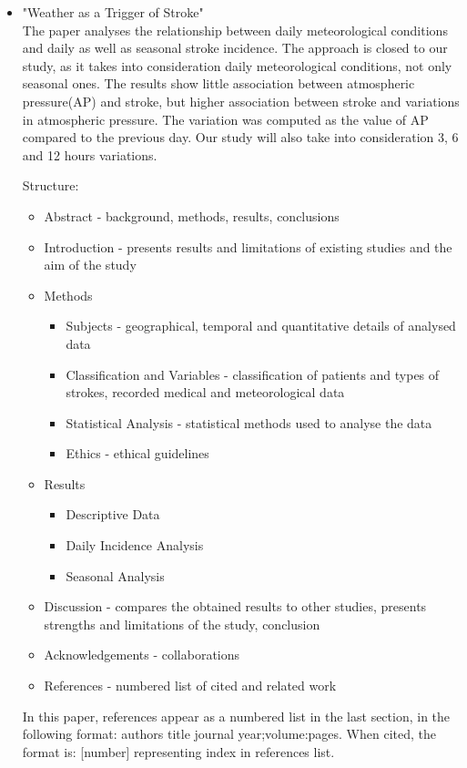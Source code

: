 \documentclass{article}
\begin{document}
\begin{itemize}
\item\large "Weather as a Trigger of Stroke"\\

\normalsize The paper \cite{Jimenez-Condea:2008dg} analyses the relationship between daily meteorological conditions and daily as well as seasonal stroke incidence. The approach is closed to our study, as it takes into consideration daily meteorological conditions, not only seasonal ones. The results show little association between atmospheric pressure(AP) and stroke, but higher association between stroke and variations in atmospheric pressure. The variation was computed as the value of AP compared to the previous day. Our study will also take into consideration 3, 6 and 12 hours variations. 

Structure:
\begin{itemize}
\item Abstract - background, methods, results, conclusions
\item Introduction - presents results and limitations of existing studies and the aim of the study
\item Methods 
\begin{itemize}
\item Subjects - geographical, temporal and quantitative details of analysed data
\item Classification and Variables - classification of patients and types of strokes, recorded medical and meteorological data
\item Statistical Analysis - statistical methods used to analyse the data
\item Ethics - ethical guidelines
\end{itemize}
\item Results 
\begin{itemize}
    \item Descriptive Data
    \item Daily Incidence Analysis
    \item Seasonal Analysis
\end{itemize}
\item Discussion - compares the obtained results to other studies, presents strengths and limitations of the study, conclusion
\item Acknowledgements - collaborations
\item References - numbered list of cited and related work
\end{itemize}
In this paper, references appear as a numbered list in the last section, in the following format: authors title journal year;volume:pages. When cited, the format is: [number] representing index in references list.\\


\end{itemize}
\end{document}
